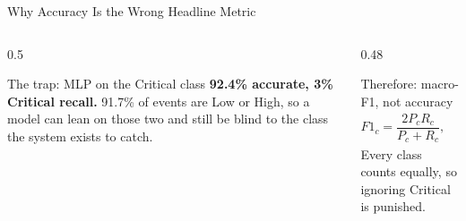 \begin{frame}{Why Accuracy Is the Wrong Headline Metric}
  \vspace{3mm}
  \begin{columns}[T]
    \begin{column}{0.5\textwidth}
      \begin{alertblock}{The trap: MLP on the Critical class}
        \small \textbf{92.4\% accurate, 3\% Critical recall.} 91.7\% of events
        are Low or High, so a model can lean on those two and still be blind to
        the class the system exists to catch.
      \end{alertblock}
    \end{column}
    \begin{column}{0.48\textwidth}
      \begin{exampleblock}{Therefore: macro-F1, not accuracy}
        \vspace{-4mm}
        \[ F1_c = \frac{2 P_c R_c}{P_c + R_c}, \qquad
           \text{macro-F1} = \frac{1}{C}\textstyle\sum_{c=1}^{C} F1_c \]
        \small Every class counts equally, so ignoring Critical is punished.
      \end{exampleblock}
    \end{column}
  \end{columns}
\end{frame}
